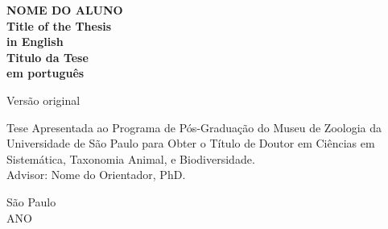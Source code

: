 \documentclass[12pt,twoside,a4paper]{book}
\begin{document}
\frontmatter 
\fancyhead[RO]{{\footnotesize\rightmark}\hspace{2em}\thepage}
\setcounter{tocdepth}{2}
\fancyhead[LE]{\thepage\hspace{2em}\footnotesize{\leftmark}}
\fancyhead[RE,LO]{}
\fancyhead[RO]{{\footnotesize\rightmark}\hspace{2em}\thepage}

\onehalfspacing  %

\thispagestyle{empty}
\begin{center}
    \vspace*{1cm}
    \textbf{\Large{NOME DO ALUNO}}\\
    
    \vspace*{2.2cm}
    \textbf{\Large{Title of the Thesis \\
    in English}}\\
    
    \vspace*{1.2cm}
    \textbf{\Large{Titulo da Tese\\
    em português}}\\
    
    \vskip 1cm

    \normalsize{Versão original}    

  
    \vskip 4cm
    \begin{changemargin}{8.25cm}{0.3cm}
    \begin{normalsize}
    \noindent Tese Apresentada ao Programa de Pós-Graduação do Museu de Zoologia da Universidade de São Paulo para Obter o Título de Doutor em Ciências em Sistemática, Taxonomia Animal, e Biodiversidade.\\

    \vspace{0.5cm}
    \noindent Advisor: Nome do Orientador, PhD.
    \end{normalsize}
    \end{changemargin}
    
    \vskip 4.5cm
    \normalsize{São Paulo\\
    ANO}

\end{center}
\end{document}
